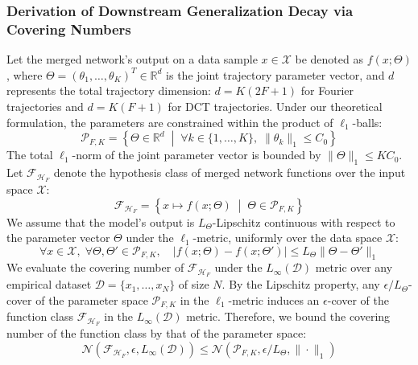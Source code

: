 \subsubsection{Derivation of Downstream Generalization Decay via Covering Numbers}
Let the merged network's output on a data sample $x \in \mathcal{X}$ be denoted as $f(x; \Theta)$, where $\Theta = (\theta_1, \dots, \theta_K)^T \in \mathbb{R}^{d}$ is the joint trajectory parameter vector, and $d$ represents the total trajectory dimension: $d = K(2F+1)$ for Fourier trajectories and $d = K(F+1)$ for DCT trajectories. Under our theoretical formulation, the parameters are constrained within the product of $\ell_1$-balls:
\begin{equation}
    \mathcal{P}_{F, K} = \left\{ \Theta \in \mathbb{R}^d \;\middle|\; \forall k \in \{1, \dots, K\}, \; \|\theta_k\|_1 \le C_0 \right\}
\end{equation}
The total $\ell_1$-norm of the joint parameter vector is bounded by $\|\Theta\|_1 \le K C_0$. Let $\mathcal{F}_{\mathcal{H}_F}$ denote the hypothesis class of merged network functions over the input space $\mathcal{X}$:
\begin{equation}
    \mathcal{F}_{\mathcal{H}_F} = \left\{ x \mapsto f(x; \Theta) \;\middle|\; \Theta \in \mathcal{P}_{F, K} \right\}
\end{equation}
We assume that the model's output is $L_{\Theta}$-Lipschitz continuous with respect to the parameter vector $\Theta$ under the $\ell_1$-metric, uniformly over the data space $\mathcal{X}$:
\begin{equation}
    \forall x \in \mathcal{X}, \; \forall \Theta, \Theta' \in \mathcal{P}_{F, K}, \quad |f(x; \Theta) - f(x; \Theta')| \le L_{\Theta} \|\Theta - \Theta'\|_1
\end{equation}
We evaluate the covering number of $\mathcal{F}_{\mathcal{H}_F}$ under the $L_\infty(\mathcal{D})$ metric over any empirical dataset $\mathcal{D} = \{x_1, \dots, x_N\}$ of size $N$. By the Lipschitz property, any $\epsilon/L_{\Theta}$-cover of the parameter space $\mathcal{P}_{F, K}$ in the $\ell_1$-metric induces an $\epsilon$-cover of the function class $\mathcal{F}_{\mathcal{H}_F}$ in the $L_\infty(\mathcal{D})$ metric. Therefore, we bound the covering number of the function class by that of the parameter space:
\begin{equation}
    \mathcal{N}(\mathcal{F}_{\mathcal{H}_F}, \epsilon, L_\infty(\mathcal{D})) \le \mathcal{N}(\mathcal{P}_{F, K}, \epsilon / L_{\Theta}, \|\cdot\|_1)
\end{equation}
